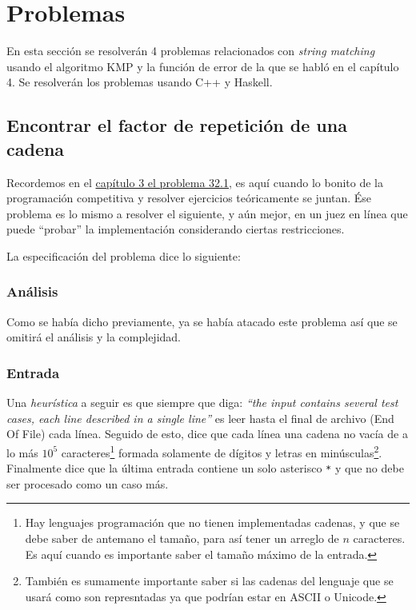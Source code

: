 
\section{Problemas}
En esta sección se resolverán 4 problemas relacionados con \textit{string matching} usando el
algoritmo KMP y la función de error de la que se habló en el capítulo 4. Se resolverán los
problemas usando C++ y Haskell.

\subsection{Encontrar el factor de repetición de una cadena}
Recordemos en el \hyperlink{repetition_factor}{capítulo 3 el problema 32.1}, es aquí cuando lo
bonito de la programación competitiva y resolver ejercicios teóricamente se juntan. Ése problema
es lo mismo a resolver el siguiente, y aún mejor, en un juez en línea que puede ``probar'' la
implementación considerando ciertas restricciones.

La especificación del problema dice lo siguiente: 



\subsubsection{Análisis}
Como se había dicho previamente, ya se había atacado este problema así que se omitirá el análisis
y la complejidad.

\subsubsection{Entrada}
Una \textit{heurística} a seguir es que siempre que diga: \textit{``the input contains several test
cases, each line described in a single line''} es leer hasta el final de archivo (End Of File) cada
línea. Seguido de esto, dice que cada línea una cadena no vacía de a lo más $10^5$
caracteres\footnote{Hay lenguajes programación que no tienen implementadas cadenas, y que se debe
saber de antemano el tamaño, para así tener un arreglo de $n$ caracteres. Es aquí cuando es
importante saber el tamaño máximo de la entrada.} formada solamente de dígitos y letras en
minúsculas\footnote{También es sumamente importante saber si las cadenas del lenguaje que se usará
como son represntadas ya que podrían estar en ASCII o Unicode.}.
Finalmente dice que la última entrada contiene un solo asterisco \texttt{*} y que no debe ser
procesado como un caso más.

